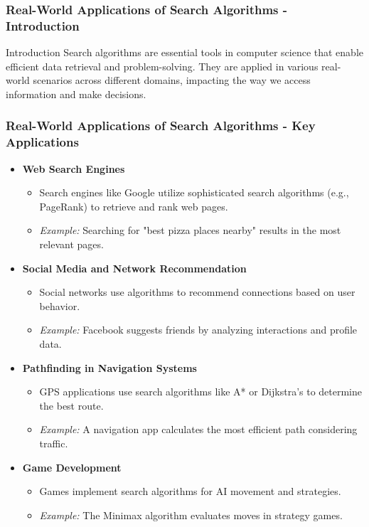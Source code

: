 \documentclass[aspectratio=169]{beamer}
\begin{document}
\begin{frame}[fragile]
    \frametitle{Real-World Applications of Search Algorithms - Introduction}
    \begin{block}{Introduction}
        Search algorithms are essential tools in computer science that enable efficient data retrieval and problem-solving. They are applied in various real-world scenarios across different domains, impacting the way we access information and make decisions.
    \end{block}
\end{frame}

\begin{frame}[fragile]
    \frametitle{Real-World Applications of Search Algorithms - Key Applications}
    \begin{itemize}
        \item \textbf{Web Search Engines}
            \begin{itemize}
                \item Search engines like Google utilize sophisticated search algorithms (e.g., PageRank) to retrieve and rank web pages.
                \item \textit{Example:} Searching for "best pizza places nearby" results in the most relevant pages.
            \end{itemize}
        
        \item \textbf{Social Media and Network Recommendation}
            \begin{itemize}
                \item Social networks use algorithms to recommend connections based on user behavior.
                \item \textit{Example:} Facebook suggests friends by analyzing interactions and profile data.
            \end{itemize}
        
        \item \textbf{Pathfinding in Navigation Systems}
            \begin{itemize}
                \item GPS applications use search algorithms like A* or Dijkstra's to determine the best route.
                \item \textit{Example:} A navigation app calculates the most efficient path considering traffic.
            \end{itemize}
        
        \item \textbf{Game Development}
            \begin{itemize}
                \item Games implement search algorithms for AI movement and strategies.
                \item \textit{Example:} The Minimax algorithm evaluates moves in strategy games.
            \end{itemize}
        

\end{itemize}
\end{frame}
\end{document}
